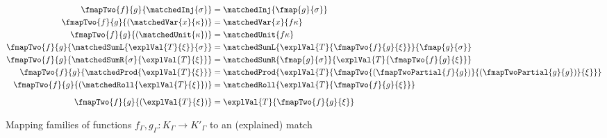 \begin{figure}
{\small
\begin{align*}
   \fmapTwo{f}{g}{\matchedInj{\sigma}}
   &=
   \matchedInj{\fmap{g}{\sigma}}
   \\
   \fmapTwo{f}{g}{(\matchedVar{x}{\kappa})}
   &=
   \matchedVar{x}{f\kappa}
   \\
   \fmapTwo{f}{g}{(\matchedUnit{\kappa})}
   &=
   \matchedUnit{f\kappa}
   \\
   \fmapTwo{f}{g}{\matchedSumL{\explVal{T}{\xi}}{\sigma}}
   &=
   \matchedSumL{\explVal{T}{\fmapTwo{f}{g}{\xi}}}{\fmap{g}{\sigma}}
   \\
   \fmapTwo{f}{g}{\matchedSumR{\sigma}{\explVal{T}{\xi}}}
   &=
   \matchedSumR{\fmap{g}{\sigma}}{\explVal{T}{\fmapTwo{f}{g}{\xi}}}
   \\
   \fmapTwo{f}{g}{\matchedProd{\explVal{T}{\xi}}}
   &=
   \matchedProd{\explVal{T}{\fmapTwo{(\fmapTwoPartial{f}{g})}{(\fmapTwoPartial{g}{g})}{\xi}}}
   \\
   \fmapTwo{f}{g}{(\matchedRoll{\explVal{T}{\xi}})}
   &=
   \matchedRoll{\explVal{T}{\fmapTwo{f}{g}{\xi}}}
   \\[2mm]
   \fmapTwo{f}{g}{(\explVal{T}{\xi})}
   &=
   \explVal{T}{\fmapTwo{f}{g}{\xi}}
\end{align*}}
\caption{Mapping families of functions $f_{\Gamma}, g_{\Gamma}: K_{\Gamma} \to K'_{\Gamma}$ to an (explained) match}
\end{figure}
